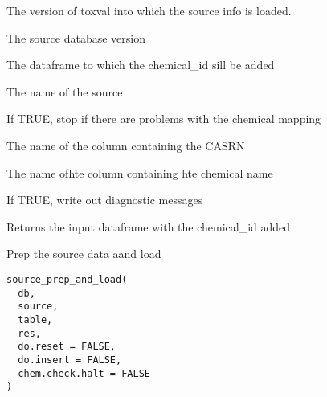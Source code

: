 \documentclass[letterpaper]{book}
\begin{document}
%
\begin{Arguments}
\begin{ldescription}
\item[\code{toxval.db}] The version of toxval into which the source info is loaded.

\item[\code{source.db}] The source database version

\item[\code{res}] The dataframe to which the chemical\_id sill be added

\item[\code{source}] The name of the source

\item[\code{chem.check.halt}] If TRUE, stop if there are problems with the chemical mapping

\item[\code{casrn.col}] The name of the column containing the CASRN

\item[\code{name.col}] The name ofhte column containing hte chemical name

\item[\code{verbose}] If TRUE, write out diagnostic messages
\end{ldescription}
\end{Arguments}
%
\begin{Value}
Returns the input dataframe with the chemical\_id added
\end{Value}
%
\begin{Description}\relax
Prep the source data aand load
\end{Description}
%
\begin{Usage}
\begin{verbatim}
source_prep_and_load(
  db,
  source,
  table,
  res,
  do.reset = FALSE,
  do.insert = FALSE,
  chem.check.halt = FALSE
)
\end{verbatim}
\end{Usage}
%
\end{document}
